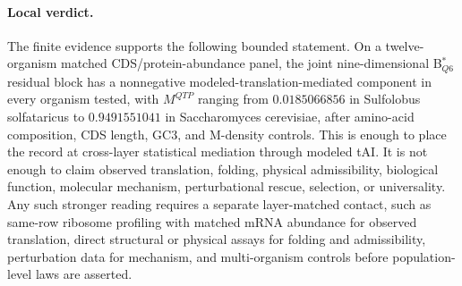 \paragraph{Local verdict.}
The finite evidence supports the following bounded statement.  On a twelve-organism matched CDS/protein-abundance panel, the joint nine-dimensional B$^{\ast}_{Q6}$ residual block has a nonnegative modeled-translation-mediated component in every organism tested, with $M^{QTP}$ ranging from $0.0185066856$ in Sulfolobus solfataricus to $0.9491551041$ in Saccharomyces cerevisiae, after amino-acid composition, CDS length, GC3, and M-density controls.  This is enough to place the record at cross-layer statistical mediation through modeled tAI.  It is not enough to claim observed translation, folding, physical admissibility, biological function, molecular mechanism, perturbational rescue, selection, or universality.  Any such stronger reading requires a separate layer-matched contact, such as same-row ribosome profiling with matched mRNA abundance for observed translation, direct structural or physical assays for folding and admissibility, perturbation data for mechanism, and multi-organism controls before population-level laws are asserted.
